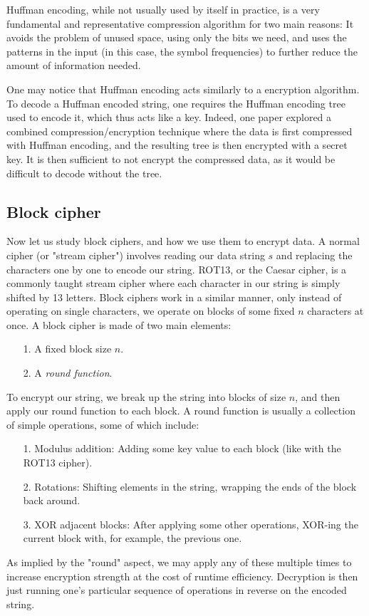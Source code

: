 \documentclass[11pt]{article}
\begin{document}
Huffman encoding, while not usually used by itself in practice, is a very fundamental and representative compression 
algorithm for two main reasons: It avoids the problem of unused space, using only the bits we need, and 
uses the patterns in the input (in this case, the symbol frequencies) to further reduce the amount of information needed.

One may notice that Huffman encoding acts similarly to a encryption algorithm. To decode a Huffman encoded string, 
one requires the Huffman encoding tree used to encode it, which thus acts like a key. Indeed, one paper\cite{sangwan} explored 
a combined compression/encryption technique where the data is first compressed with Huffman encoding, and the 
resulting tree is then encrypted with a secret key. It is then sufficient to not encrypt the compressed data, 
as it would be difficult to decode without the tree.

\subsection{Block cipher}\label{block-cipher-subsect}
Now let us study block ciphers, and how we use them to encrypt data. A normal cipher (or "stream cipher") involves 
reading our data string $s$ and replacing the characters one by one to encode our string. 
ROT13, or the Caesar cipher, is a commonly taught stream cipher where each character in our string is 
simply shifted by 13 letters. Block ciphers work in a similar manner, only instead of operating on single 
characters, we operate on blocks of some fixed $n$ characters at once. 
A block cipher is made of two main elements:
\begin{itemize}
	\item[1.] A fixed block size $n$.
	\item[2.] A \emph{round function}.
\end{itemize}
To encrypt our string, we break up the string into blocks of size $n$, and then apply our round function to each block. 
A round function is usually a collection of simple operations, some of which include:
\begin{itemize}
	\item[1.] Modulus addition: Adding some key value to each block (like with the ROT13 cipher).
	\item[2.] Rotations: Shifting elements in the string, wrapping the ends of the block back around.
	\item[3.] XOR adjacent blocks: After applying some other operations, XOR-ing the current block with, 
for example, the previous one. 
\end{itemize}
As implied by the "round" aspect, we may apply any of these multiple times to increase encryption strength at the cost 
of runtime efficiency. Decryption is then just running one's particular sequence of operations in reverse on the 
encoded string.
\end{document}
